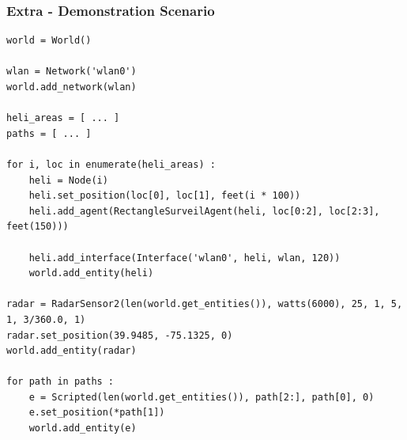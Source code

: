 \documentclass[mathserif]{beamer}
\begin{document}
\begin{frame}[fragile]
    \frametitle{Extra - Demonstration Scenario}
    \tiny
    \begin{verbatim}
world = World()

wlan = Network('wlan0')
world.add_network(wlan)

heli_areas = [ ... ]
paths = [ ... ]

for i, loc in enumerate(heli_areas) :
    heli = Node(i)
    heli.set_position(loc[0], loc[1], feet(i * 100))
    heli.add_agent(RectangleSurveilAgent(heli, loc[0:2], loc[2:3], feet(150)))

    heli.add_interface(Interface('wlan0', heli, wlan, 120))
    world.add_entity(heli)

radar = RadarSensor2(len(world.get_entities()), watts(6000), 25, 1, 5, 1, 3/360.0, 1)
radar.set_position(39.9485, -75.1325, 0)
world.add_entity(radar)

for path in paths :
    e = Scripted(len(world.get_entities()), path[2:], path[0], 0)
    e.set_position(*path[1])
    world.add_entity(e)
    \end{verbatim}
\end{frame}
\end{document}
